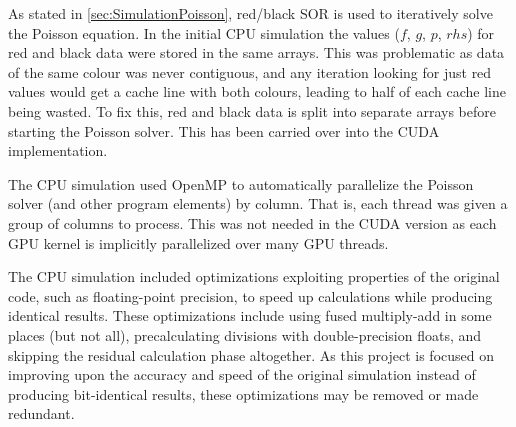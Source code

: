 As stated in \cref{sec:SimulationPoisson}, red/black SOR is used to iteratively solve the Poisson equation.
In the initial CPU simulation the values ($f$, $g$, $p$, $rhs$) for red and black data were stored in the same arrays.
This was problematic as data of the same colour was never contiguous, and any iteration looking for just red values would get a cache line with both colours, leading to half of each cache line being wasted.
To fix this, red and black data is split into separate arrays before starting the Poisson solver.
This has been carried over into the CUDA implementation.

The CPU simulation used OpenMP\cite{OpenMPHomeOpenMP} to automatically parallelize the Poisson solver (and other program elements) by column.
That is, each thread was given a group of columns to process.
This was not needed in the CUDA version as each GPU kernel is implicitly parallelized over many GPU threads.

The CPU simulation included optimizations exploiting properties of the original code, such as floating-point precision, to speed up calculations while producing identical results.
These optimizations include using fused multiply-add\cite{Muller2010TheInstruction} in some places (but not all), precalculating divisions with double-precision floats, and skipping the residual calculation phase altogether.
As this project is focused on improving upon the accuracy and speed of the original simulation instead of producing bit-identical results, these optimizations may be removed or made redundant.




